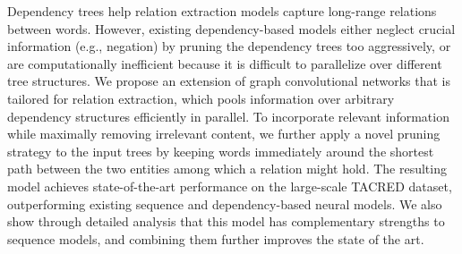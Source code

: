 Dependency trees help relation extraction models capture long-range relations between words. However, existing dependency-based models either neglect crucial information (e.g., negation) by pruning the dependency trees too aggressively, or are computationally inefficient because it is difficult to parallelize over different tree structures. We propose an extension of graph convolutional networks that is tailored for relation extraction, which pools information over arbitrary dependency structures efficiently in parallel. To incorporate relevant information while maximally removing irrelevant content, we further apply a novel pruning strategy to the input trees by keeping words immediately around the shortest path between the two entities among which a relation might hold. The resulting model achieves state-of-the-art performance on the large-scale TACRED dataset, outperforming existing sequence and dependency-based neural models. We also show through detailed analysis that this model has complementary strengths to sequence models, and combining them further improves the state of the art.
